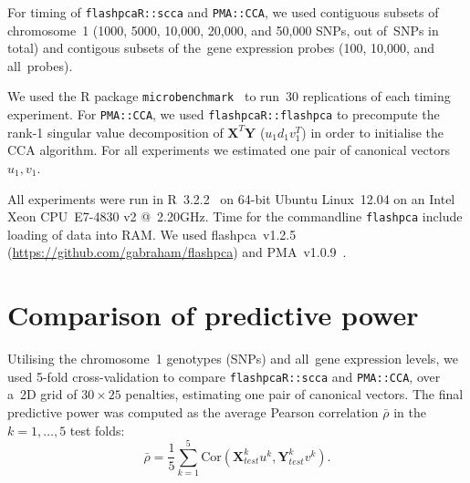 \documentclass[a4paper,12pt]{article}
\begin{document}
For timing of \texttt{flashpcaR::scca} and \texttt{PMA::CCA}, we used contiguous
subsets of chromosome~1 (1000, 5000, 10,000, 20,000, and 50,000 SNPs, out
of~\ngenes SNPs in total) and contigous subsets of the~\ngenes gene expression
probes (100, 10,000, and all~\ngenes probes).

We used the \textsf{R} package \texttt{microbenchmark}~\citep{Mersmann2015} to
run~30 replications of each timing experiment. For \texttt{PMA::CCA}, we used
\texttt{flashpcaR::flashpca} to precompute the rank-1 singular value
decomposition of $\mathbf{X}^T \mathbf{Y}$ ($u_1 d_1 v_1^T$) in order to
initialise the CCA algorithm. For all experiments we estimated one pair of
canonical vectors $u_1, v_1$.

All experiments were run in \textsf{R}~3.2.2~\citep{R} on 64-bit Ubuntu
Linux~12.04 on an Intel Xeon CPU~E7-4830 v2 @~2.20GHz. Time for the commandline
\texttt{flashpca} include loading of data into RAM. We used flashpca~v1.2.5
(\url{https://github.com/gabraham/flashpca}) and PMA~v1.0.9~\citep{Witten2013}.

\section{Comparison of predictive power}

Utilising the chromosome~1 genotypes (\nsnpschr SNPs) and all~\ngenes gene
expression levels, we used 5-fold cross-validation to compare
\texttt{flashpcaR::scca} and \texttt{PMA::CCA}, over a~2D grid of $30\times25$
penalties, estimating one pair of canonical vectors. The final predictive power
was computed as the average Pearson correlation
$\bar{\rho}$ in the~$k=1,\hdots,5$ test folds:
$$
\bar{\rho} = \frac{1}{5} \sum_{k=1}^5
   \mbox{Cor}(\mathbf{X}_{test}^k u^k, \mathbf{Y}_{test}^k v^k).
$$



\end{document}
